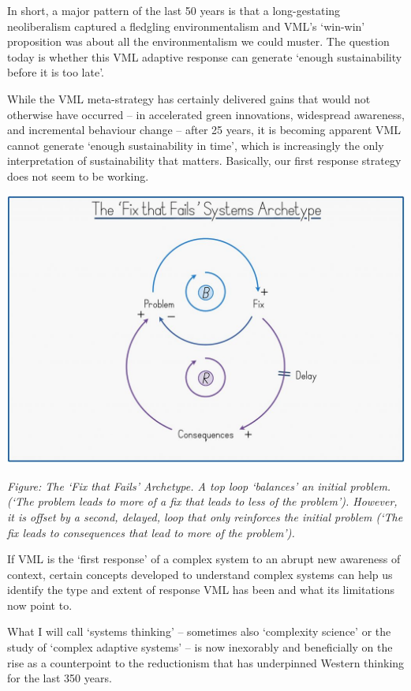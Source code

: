 \documentclass[
]{book}
\begin{document}
In short, a major pattern of the last 50 years is that a long-gestating neoliberalism captured a
fledgling environmentalism and VML's `win-win' proposition was about all the environmentalism we
could muster. The question today is whether this VML adaptive response can generate `enough
sustainability before it is too late'.

While the VML meta-strategy has certainly delivered gains that would not otherwise have occurred --
in accelerated green innovations, widespread awareness, and incremental behaviour change -- after
25 years, it is becoming apparent VML cannot generate `enough sustainability in time', which is
increasingly the only interpretation of sustainability that matters.
Basically, our first response strategy does not seem to be working.

\includegraphics{fig/austin_fix_fails.jpg}

\emph{Figure: The `Fix that Fails' Archetype. A top loop `balances' an initial problem.
(`The problem leads to more of a fix that leads to less of the problem'). However, it is
offset by a second, delayed, loop that only reinforces the initial problem (`The fix
leads to consequences that lead to more of the problem').}

If VML is the `first response' of a complex system to an abrupt new awareness of context, certain
concepts developed to understand complex systems can help us identify the type and extent of
response VML has been and what its limitations now point to.

What I will call `systems thinking' -- sometimes also `complexity science' or the study of `complex
adaptive systems' -- is now inexorably and beneficially on the rise as a counterpoint to the
reductionism that has underpinned Western thinking for the last 350 years.
\end{document}
